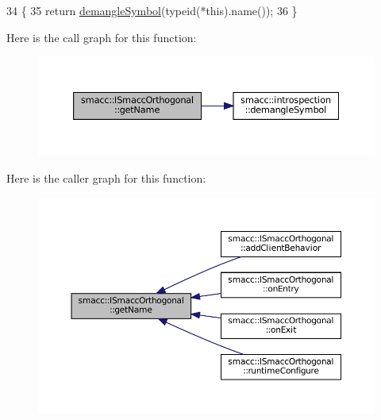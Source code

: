 \begin{DoxyCode}
34   \{
35     \textcolor{keywordflow}{return} \hyperlink{namespacesmacc_1_1introspection_a2f495108db3e57604d8d3ff5ef030302}{demangleSymbol}(\textcolor{keyword}{typeid}(*this).name());
36   \}
\end{DoxyCode}
Here is the call graph for this function\+:
\nopagebreak
\begin{figure}[H]
\begin{center}
\leavevmode
\includegraphics[width=350pt]{classsmacc_1_1ISmaccOrthogonal_a45a444be97410cb061f8b9d5d77ee9b7_cgraph}
\end{center}
\end{figure}
Here is the caller graph for this function\+:
\nopagebreak
\begin{figure}[H]
\begin{center}
\leavevmode
\includegraphics[width=350pt]{classsmacc_1_1ISmaccOrthogonal_a45a444be97410cb061f8b9d5d77ee9b7_icgraph}
\end{center}
\end{figure}
\mbox{\label{classsmacc_1_1ISmaccOrthogonal_aae265ec480b8ed552ddc79afd2d93a62}} 
